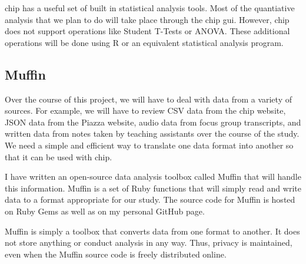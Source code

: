 \gls{chip} has a useful set of built in statistical analysis tools. Most of the quantiative analysis that we plan to do will take place through the \gls{chip} \gls{gui}. However, \gls{chip} does not support operations like Student T-Tests or ANOVA. These additional operations will be done using R or an equivalent statistical analysis program.

\subsection{Muffin}

Over the course of this project, we will have to deal with data from a variety of sources. For example, we will have to review CSV data from the \gls{chip} website, JSON data from the Piazza website, audio data from focus group transcripts, and written data from notes taken by teaching assistants over the course of the study. We need a simple and efficient way to translate one data format into another so that it can be used with \gls{chip}.

I have written an open-source data analysis toolbox called Muffin that will handle this information. Muffin is a set of Ruby functions that will simply read and write data to a format appropriate for our study. The source code for Muffin is hosted on Ruby Gems as well as on my personal GitHub page.

Muffin is simply a toolbox that converts data from one format to another. It does not store anything or conduct analysis in any way. Thus, privacy is maintained, even when the Muffin source code is freely distributed online.